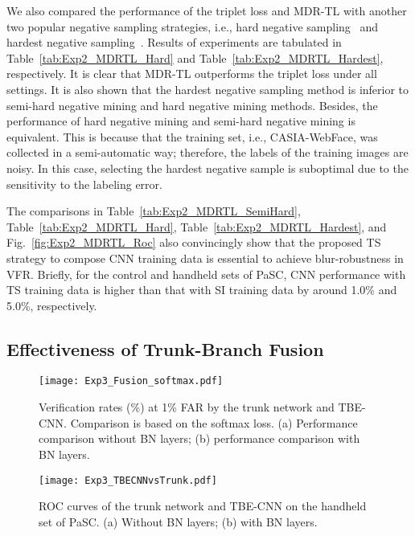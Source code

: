 \documentclass[10pt,journal,cspaper,compsoc]{IEEEtran}
\begin{document}
We also compared the performance of the triplet loss and MDR-TL with another two popular negative sampling strategies,
i.e., hard negative sampling~\cite{schroff2015facenet} and hardest negative sampling~\cite{simo2015discriminative}.
Results of experiments are tabulated in Table~\ref{tab:Exp2_MDRTL_Hard} and Table~\ref{tab:Exp2_MDRTL_Hardest}, respectively.
It is clear that MDR-TL outperforms the triplet loss under all settings.
It is also shown that the hardest negative sampling method is inferior to semi-hard negative mining and hard negative mining methods.
Besides, the performance of hard negative mining and semi-hard negative mining is equivalent.
This is because that the training set, i.e., CASIA-WebFace, was collected in a semi-automatic way;
therefore, the labels of the training images are noisy.
In this case, selecting the hardest negative sample is suboptimal due to the sensitivity to the labeling error.


The comparisons in Table~\ref{tab:Exp2_MDRTL_SemiHard}, Table~\ref{tab:Exp2_MDRTL_Hard}, Table~\ref{tab:Exp2_MDRTL_Hardest}, and Fig.~\ref{fig:Exp2_MDRTL_Roc}
also convincingly show that the proposed TS strategy to compose CNN training data is essential to achieve blur-robustness in VFR.
Briefly, for the control and handheld sets of PaSC, CNN performance with TS training data is higher than that with SI training data by around 1.0\% and 5.0\%, respectively.


\subsection{Effectiveness of Trunk-Branch Fusion}
\begin{figure}
\centering
\texttt{[image: Exp3\_Fusion\_softmax.pdf]}
\caption{Verification rates (\%) at 1\% FAR by the trunk network and TBE-CNN. Comparison is based on the softmax loss.
(a) Performance comparison without BN layers; (b) performance comparison with BN layers.}
\label{fig:Exp3_Fusion}
\end{figure}

\begin{figure}
\centering
\texttt{[image: Exp3\_TBECNNvsTrunk.pdf]}
\caption{ROC curves of the trunk network and TBE-CNN on the handheld set of PaSC. (a) Without BN layers; (b) with BN layers.}
\label{fig:Exp3_TBECNNvsTrunk}
\end{figure}
\end{document}
